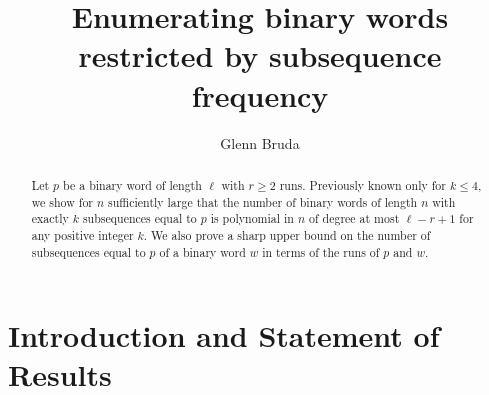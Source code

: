 \documentclass[11pt]{amsart}
\title{Enumerating binary words restricted by subsequence frequency}
\author{Glenn Bruda}
\begin{document}
\begin{abstract}
    Let $p$ be a binary word of length $\ell$ with $r\geq2$ runs. Previously known only for $k\leq4$, we show for $n$ sufficiently large that the number of binary words of length $n$ with exactly $k$ subsequences equal to $p$ is polynomial in $n$ of degree at most $\ell-r+1$ for any positive integer $k$. We also prove a sharp upper bound on the number of subsequences equal to $p$ of a binary word $w$ in terms of the runs of $p$ and $w$.
\end{abstract}

\maketitle



\thispagestyle{empty}

\section{Introduction and Statement of Results}
\end{document}
